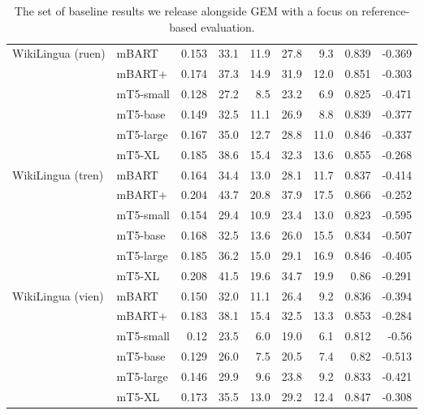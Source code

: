 \documentclass[11pt,a4paper]{article}
\newcommand{\GEM}{\textsc{GEM}}
\begin{document}
\begin{table*}[!htbp]
\begin{tabular}{@{}llrrrrrrr@{}}
\multirow{2}{*}{WikiLingua (ruen)} & \small{mBART} & 0.153 & 33.1 & 11.9 & 27.8 & 9.3 & 0.839 & -0.369 \\
 & \small{mBART+} & 0.174 & 37.3 & 14.9 & 31.9 & 12.0 & 0.851 & -0.303 \\
 & \small{mT5-small} & 0.128 & 27.2 & 8.5 & 23.2 & 6.9 & 0.825 & -0.471 \\
& \small{mT5-base} & 0.149 & 32.5 & 11.1 & 26.9 & 8.8 & 0.839 & -0.377 \\
& \small{mT5-large} & 0.167 & 35.0 & 12.7 & 28.8 & 11.0 & 0.846 & -0.337 \\
& \small{mT5-XL} & 0.185 & 38.6 & 15.4 & 32.3 & 13.6 & 0.855 & -0.268 \\
\multirow{2}{*}{WikiLingua (tren)} & \small{mBART} & 0.164 & 34.4 & 13.0 & 28.1 & 11.7 & 0.837 & -0.414 \\
 & \small{mBART+} & 0.204 & 43.7 & 20.8 & 37.9 & 17.5 & 0.866 & -0.252 \\
 & \small{mT5-small} & 0.154 & 29.4 & 10.9 & 23.4 & 13.0 & 0.823 & -0.595 \\
& \small{mT5-base} & 0.168 & 32.5 & 13.6 & 26.0 & 15.5 & 0.834 & -0.507 \\
& \small{mT5-large} & 0.185 & 36.2 & 15.0 & 29.1 & 16.9 & 0.846 & -0.405 \\
& \small{mT5-XL} & 0.208 & 41.5 & 19.6 & 34.7 & 19.9 & 0.86 & -0.291 \\
\multirow{2}{*}{WikiLingua (vien) } & \small{mBART} & 0.150 & 32.0 & 11.1 & 26.4 & 9.2 & 0.836 & -0.394 \\
 & \small{mBART+} & 0.183 & 38.1 & 15.4 & 32.5 & 13.3 & 0.853 & -0.284 \\
 & \small{mT5-small} & 0.12 & 23.5 & 6.0 & 19.0 & 6.1 & 0.812 & -0.56 \\
& \small{mT5-base} & 0.129 & 26.0 & 7.5 & 20.5 & 7.4 & 0.82 & -0.513 \\
& \small{mT5-large} & 0.146 & 29.9 & 9.6 & 23.8 & 9.2 & 0.833 & -0.421 \\
& \small{mT5-XL} & 0.173 & 35.5 & 13.0 & 29.2 & 12.4 & 0.847 & -0.308 \\
\bottomrule
\end{tabular}
\caption{The set of baseline results we release alongside \GEM{} with a focus on reference-based evaluation.}
\label{tab:results}
\end{table*}
\end{document}
